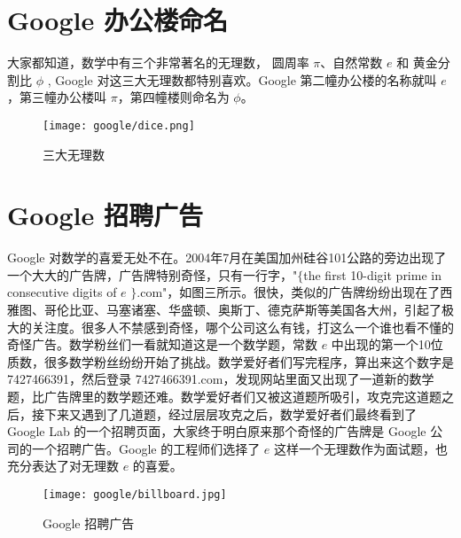 \section{Google 办公楼命名}
大家都知道，数学中有三个非常著名的无理数， 圆周率 $\pi$、自然常数 $e$ 和 黄金分割比 $\phi$ , Google 对这三大无理数都特别喜欢。Google 第二幢办公楼的名称就叫 $e$，第三幢办公楼叫 $\pi$，第四幢楼则命名为 $\phi$。
\begin{figure}[htbp]
\centering
\texttt{[image: google/dice.png]}
\caption{三大无理数}
\centering
\end{figure}

\section{Google 招聘广告}
Google 对数学的喜爱无处不在。2004年7月在美国加州硅谷101公路的旁边出现了一个大大的广告牌，广告牌特别奇怪，只有一行字，"$\{$the first 10-digit prime in consecutive digits of $e$ $\}$.com"，如图三所示。很快，类似的广告牌纷纷出现在了西雅图、哥伦比亚、马塞诸塞、华盛顿、奥斯丁、德克萨斯等美国各大州，引起了极大的关注度。很多人不禁感到奇怪，哪个公司这么有钱，打这么一个谁也看不懂的奇怪广告。数学粉丝们一看就知道这是一个数学题，常数 $e$ 中出现的第一个10位质数，很多数学粉丝纷纷开始了挑战。数学爱好者们写完程序，算出来这个数字是7427466391，然后登录 7427466391.com，发现网站里面又出现了一道新的数学题，比广告牌里的数学题还难。数学爱好者们又被这道题所吸引，攻克完这道题之后，接下来又遇到了几道题，经过层层攻克之后，数学爱好者们最终看到了 Google Lab 的一个招聘页面，大家终于明白原来那个奇怪的广告牌是 Google 公司的一个招聘广告。Google 的工程师们选择了 $e$ 这样一个无理数作为面试题，也充分表达了对无理数 $e$ 的喜爱。
\begin{figure}[htbp]
\centering
\texttt{[image: google/billboard.jpg]}
\caption{Google 招聘广告}
\centering
\end{figure}
	
